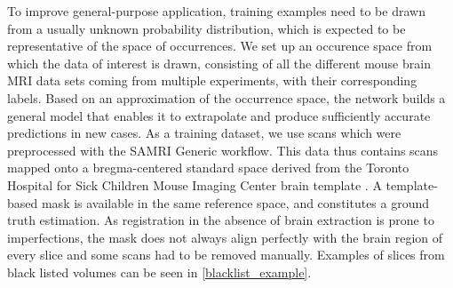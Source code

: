 To improve general-purpose application, training examples need to be drawn from a usually unknown probability distribution, which is expected to be representative of the space of occurrences.
We set up an occurence space from which the data of interest is drawn, consisting of all the different mouse brain MRI data sets coming from multiple experiments, with their corresponding labels.
Based on an approximation of the occurrence space, the network builds a general model that enables it to extrapolate and produce sufficiently accurate predictions in new cases.
As a training dataset, we use scans which were preprocessed with the SAMRI \cite{noauthor_ibt-fmi/samri_2019} Generic workflow.
This data thus contains scans mapped onto a bregma-centered standard \cite{ioanas_optimized_2019} space derived from the Toronto Hospital for Sick Children Mouse Imaging Center brain template \cite{dsu}.
A template-based mask is available in the same reference space, and constitutes a ground truth estimation.
As registration in the absence of brain extraction is prone to imperfections, the mask does not always align perfectly with the brain region of every slice and some scans had to be removed manually.
Examples of slices from black listed volumes can be seen in \cref{blacklist_example}.
